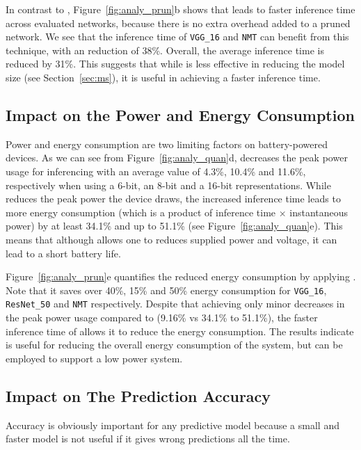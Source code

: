 In contrast to \quantization, Figure~\ref{fig:analy_prun}b shows that \pruning leads to faster inference time across evaluated networks,
because there is no extra overhead added to a pruned network. We see that the inference time of \texttt{VGG\_16} and \texttt{NMT} can
benefit from this technique, with an reduction of 38\%. Overall, the average inference time is reduced by 31\%. This suggests that while
\pruning is less effective in reducing the model size (see Section~\ref{sec:ms}), it is useful in achieving a faster inference time.

\subsection{Impact on the Power and Energy Consumption}
Power and energy consumption are two limiting factors on battery-powered devices. As we can see from Figure~\ref{fig:analy_quan}d,
\quantization decreases the peak power usage for inferencing with an average value of 4.3\%, 10.4\% and 11.6\%, respectively when using a
6-bit, an 8-bit and a 16-bit representations. While \quantization reduces the peak power the device draws, the increased inference time
leads to more energy consumption (which is a product of inference time $\times$ instantaneous power) by at least 34.1\% and up to 51.1\%
(see Figure~\ref{fig:analy_quan}e). This means that although \quantization allows one to reduces supplied power and voltage, it can lead to
a short battery life.

Figure~\ref{fig:analy_prun}e quantifies the reduced energy consumption by applying \pruning. Note that it saves over 40\%, 15\% and 50\%
energy consumption for \texttt{VGG\_16}, \texttt{ResNet\_50} and \texttt{NMT} respectively. Despite that achieving only minor decreases in
the peak power usage compared to \quantization (9.16\% vs 34.1\% to 51.1\%), the faster inference time of \pruning allows it to reduce the
energy consumption. The results indicate \pruning is useful for reducing the overall energy consumption of the system, but \quantization
can be employed to support a low power system.

\subsection{Impact on The Prediction Accuracy}
Accuracy is obviously important for any predictive model because a small and faster model is not useful if it gives wrong predictions all
the time.


